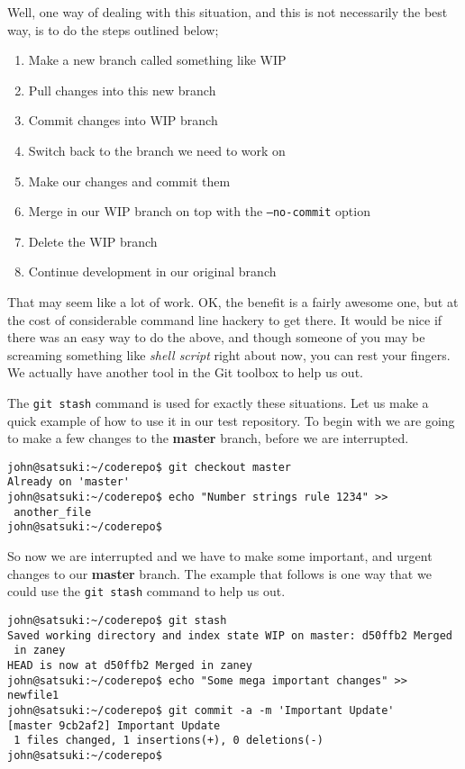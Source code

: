 Well, one way of dealing with this situation, and this is not necessarily the best way, is to do the steps outlined below;

\begin{enumerate}
\item Make a new branch called something like WIP
\item Pull changes into this new branch
\item Commit changes into WIP branch
\item Switch back to the branch we need to work on
\item Make our changes and commit them
\item Merge in our WIP branch on top with the \texttt{--no-commit} option
\item Delete the WIP branch
\item Continue development in our original branch
\end{enumerate}

That may seem like a lot of work.  OK, the benefit is a fairly awesome one, but at the cost of considerable command line hackery to get there.  It would be nice if there was an easy way to do the above, and though someone of you may be screaming something like \emph{shell script} right about now, you can rest your fingers.  We actually have another tool in the Git toolbox to help us out.

The \texttt{git stash} command is used for exactly these situations.  Let us make a quick example of how to use it in our test repository.  To begin with we are going to make a few changes to the \textbf{master} branch, before we are interrupted.

\begin{Verbatim}
john@satsuki:~/coderepo$ git checkout master
Already on 'master'
john@satsuki:~/coderepo$ echo "Number strings rule 1234" >> 
 another_file
john@satsuki:~/coderepo$ 
\end{Verbatim}

So now we are interrupted and we have to make some important, and urgent changes to our \textbf{master} branch.  The example that follows is one way that we could use the \texttt{git stash} command to help us out.  

\begin{Verbatim}
john@satsuki:~/coderepo$ git stash
Saved working directory and index state WIP on master: d50ffb2 Merged 
 in zaney
HEAD is now at d50ffb2 Merged in zaney
john@satsuki:~/coderepo$ echo "Some mega important changes" >> newfile1
john@satsuki:~/coderepo$ git commit -a -m 'Important Update'
[master 9cb2af2] Important Update
 1 files changed, 1 insertions(+), 0 deletions(-)
john@satsuki:~/coderepo$ 
\end{Verbatim}

